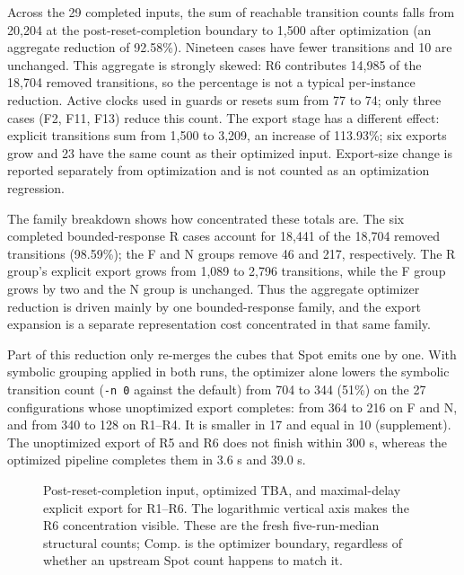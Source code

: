 Across the 29 completed inputs, the sum of reachable transition counts falls
from 20,204 at the post-reset-completion boundary to 1,500 after optimization
(an aggregate reduction of 92.58\%). Nineteen cases have fewer transitions
and 10 are unchanged. This aggregate is strongly skewed: R6 contributes
14,985 of the 18,704 removed transitions, so the percentage is not a typical
per-instance reduction. Active clocks used in guards or resets sum from 77
to 74; only three cases (F2, F11, F13) reduce this count. The export stage has a different
effect: explicit transitions sum from 1,500 to 3,209, an increase of
113.93\%; six exports grow and 23 have the same count as their optimized
input. Export-size change is reported separately from optimization and is
not counted as an optimization regression.

The family breakdown shows how concentrated these totals are. The six
completed bounded-response R cases account for 18,441 of the 18,704 removed
transitions (98.59\%); the F and N groups remove 46 and 217, respectively.
The R group's explicit export grows from 1,089 to 2,796 transitions, while
the F group grows by two and the N group is unchanged. Thus the aggregate
optimizer reduction is driven mainly by one bounded-response family, and the
export expansion is a separate representation cost concentrated in that same
family.

Part of this reduction only re-merges the cubes that Spot emits one by one.
With symbolic grouping applied in both runs, the optimizer alone lowers the
symbolic transition count (\texttt{-n 0} against the default) from 704 to 344
(51\%) on the 27 configurations whose unoptimized export completes: from 364
to 216 on F and N, and from 340 to 128 on R1--R4. It is smaller in 17 and
equal in 10 (supplement). The unoptimized export of R5 and R6 does not finish
within 300 s, whereas the optimized pipeline completes them in 3.6 s and 39.0 s.

\begin{figure}[t]
\centering

\caption{Post-reset-completion input, optimized TBA, and maximal-delay
explicit export for R1--R6. The logarithmic vertical axis makes the R6
concentration visible. These are the fresh five-run-median structural
counts; Comp. is the optimizer boundary, regardless of whether an upstream
Spot count happens to match it.}
\label{fig:R-transition-counts}
\end{figure}


